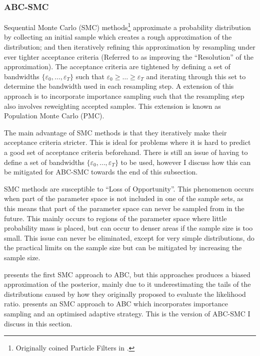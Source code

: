 \documentclass[11pt,a4paper]{article}
\theoremstyle{break}
\begin{document}
\subsubsection{ABC-SMC}\label{sec_abc_smc}

  \par Sequential Monte Carlo (SMC) methods\footnote{Originally coined Particle Filters in \cite[]{non_linear_filtering_interacting_particle_resolution}.} approximate a probability distribution by collecting an initial sample which creates a rough approximation of the distribution; and then iteratively refining this approximation by resampling under ever tighter acceptance criteria (Referred to as improving the ``Resolution'' of the approximation). The acceptance criteria are tightened by defining a set of bandwidths $\{\varepsilon_0,\dots,\varepsilon_T\}$ such that $\varepsilon_0\geq\dots\geq\varepsilon_T$ and iterating through this set to determine the bandwidth used in each resampling step. A extension of this approach is to incorporate importance sampling such that the resampling step also involves reweighting accepted samples. This extension is known as Population Monte Carlo (PMC).

  \par The main advantage of SMC methods is that they iteratively make their acceptance criteria stricter. This is ideal for problems where it is hard to predict a good set of acceptance criteria beforehand. There is still an issue of having to define a set of bandwidths $\{\varepsilon_0,\dots,\varepsilon_T\}$ to be used, however I discuss how this can be mitigated for ABC-SMC towards the end of this subsection.

  \par SMC methods are susceptible to ``Loss of Opportunity''. This phenomenon occurs when part of the parameter space is not included in one of the sample sets, as this means that part of the parameter space can never be sampled from in the future. This mainly occurs to regions of the parameter space where little probability mass is placed, but can occur to denser areas if the sample size is too small. This issue can never be eliminated, except for very simple distributions, do the practical limits on the sample size but can be mitigated by increasing the sample size.

  \par \cite[]{SMC_wo_likelihood} presents the first SMC approach to ABC, but this approaches produces a biased approximation of the posterior, mainly due to it underestimating the tails of the distributions caused by how they originally proposed to evaluate the likelihood ratio. \cite[]{adaptive_ABC} presents an SMC approach to ABC which incorporates importance sampling and an optimised adaptive strategy. This is the version of ABC-SMC I discuss in this section.
\end{document}
